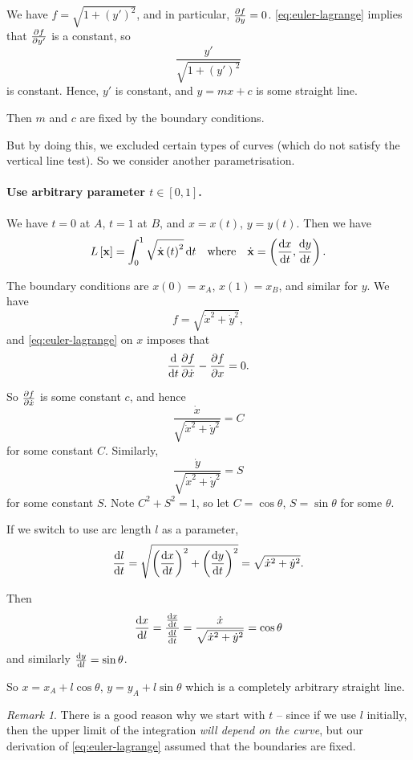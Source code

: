 \documentclass[11pt]{article}
\numberwithin{equation}{section}
\theoremstyle{definition}
\theoremstyle{remark}
\newtheorem{remark}[theorem]{Remark}
\newcommand{\pqty}[1]{\left(#1\right)}
\newcommand{\bqty}[1]{\left[#1\right]}
\newcommand{\flatfrac}[2]{\frac{#1}{#2}}
\newcommand{\ccintv}[2]{[#1,#2]}
\newcommand{\qqtext}[1]{\quad\text{#1}\quad}
\begin{document}
    We have \(f = \sqrt{1 + \pqty{y'}^2}\), and in particular, \(\pdv*{f}{y} = 0\). \autoref{eq:euler-lagrange} implies that \(\pdv{f}{y'}\) is a constant, so
    \[
        \frac{y'}{\sqrt{1 + \pqty{y'}^2}}
    \]
    is constant. Hence, \(y'\) is constant, and \(y = mx + c\) is some straight line.

    Then \(m\) and \(c\) are fixed by the boundary conditions.

But by doing this, we excluded certain types of curves (which do not satisfy the vertical line test). So we consider another parametrisation.

\paragraph{Use arbitrary parameter \(t \in \ccintv{0}{1}\).} We have \(t = 0\) at \(A\), \(t = 1\) at \(B\), and \(x = x\pqty{t}\), \(y = y\pqty{t}\). Then we have
\[
    L\bqty{\vb{x}} = \int_{0}^{1} \sqrt{\dot{\vb{x}}\pqty{t}^2} \dd{t} \qqtext{where} \dot{\vb{x}} = \pqty{\dv{x}{t}, \dv{y}{t}}.
\]

The boundary conditions are \(x\pqty{0} = x_A\), \(x\pqty{1} = x_B\), and similar for \(y\). We have
\[
    f = \sqrt{\dot{x}^2 + \dot{y}^2},
\]
and \autoref{eq:euler-lagrange} on \(x\) imposes that
\[
    \dv{t} \pdv{f}{\dot{x}} - \pdv{f}{x} = 0.
\]

So \(\pdv{f}{\dot{x}}\) is some constant \(c\), and hence
\[
    \frac{\dot{x}}{\sqrt{\dot{x}^2 + \dot{y}^2}} = C
\]
for some constant \(C\). Similarly,
\[
    \frac{\dot{y}}{\sqrt{\dot{x}^2 + \dot{y}^2}} = S
\]
for some constant \(S\). Note \(C^2 + S^2 = 1\), so let \(C = \cos \theta\), \(S = \sin \theta\) for some \(\theta\).

If we switch to use arc length \(l\) as a parameter,
\[
    \dv{l}{t} = \sqrt{\pqty{\dv{x}{t}}^2 + \pqty{\dv{y}{t}}^2} = \sqrt{\dot{x}^2 + \dot{y}^2}.
\]

Then
\[
    \dv{x}{l} = \flatfrac{\dv{x}{t}}{\dv{l}{t}} = \frac{\dot{x}}{\sqrt{{\dot{x}}^2 + {\dot{y}}^2}} = \cos \theta
\]
and similarly \(\dv*{y}{l} = \sin \theta\).

So \(x = x_A + l \cos \theta\), \(y = y_A + l \sin \theta\) which is a completely arbitrary straight line.

\begin{remark}\label{variation-unit-0044}
    There is a good reason why we start with \(t\) -- since if we use \(l\) initially, then the upper limit of the integration \emph{will depend on the curve}, but our derivation of \autoref{eq:euler-lagrange} assumed that the boundaries are fixed.
\end{remark}
\end{document}
